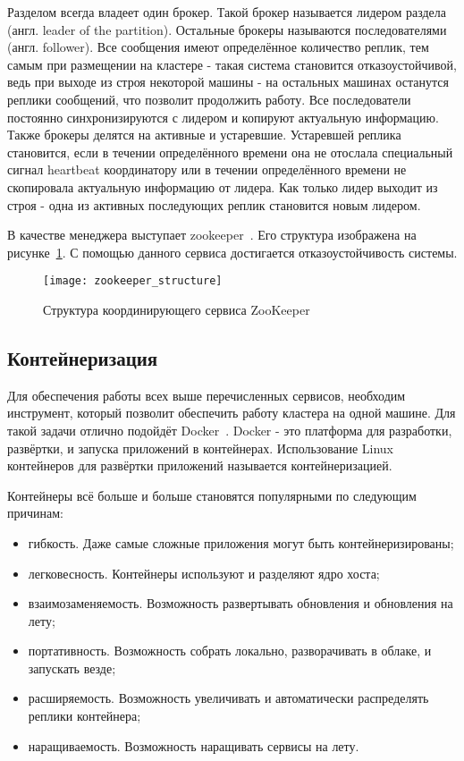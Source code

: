 Разделом всегда владеет один брокер.
Такой брокер называется лидером раздела (англ. leader of the partition).
Остальные брокеры называются последователями (англ. follower).
Все сообщения имеют определённое количество реплик, тем самым при размещении на кластере - такая система становится отказоустойчивой, ведь при выходе из строя некоторой машины - на остальных машинах останутся реплики сообщений, что позволит продолжить работу.
Все последователи постоянно синхронизируются с лидером и копируют актуальную информацию.
Также брокеры делятся на активные и устаревшие.
Устаревшей реплика становится, если в течении определённого времени она не отослала специальный сигнал heartbeat координатору или в течении определённого времени не скопировала актуальную информацию от лидера.
Как только лидер выходит из строя - одна из активных последующих реплик становится новым лидером.

В качестве менеджера выступает zookeeper~\cite{zookeeper_documentation_intro}.
Его структура изображена на рисунке~\ref{pic:lit_review:zookeeper_structure}.                   
С помощью данного сервиса достигается отказоустойчивость системы.

\begin{figure}
    \centering
    \texttt{[image: zookeeper\_structure]}
    \caption{Структура координирующего сервиса ZooKeeper~\cite{zookeeper_documentation_intro}}
    \label{pic:lit_review:zookeeper_structure}
\end{figure}

\subsection{Контейнеризация}

Для обеспечения работы всех выше перечисленных сервисов, необходим инструмент, который позволит обеспечить работу кластера на одной машине.
Для такой задачи отлично подойдёт Docker~\cite{docker_documentation_intro}.
Docker - это платформа для разработки, развёртки, и запуска приложений в контейнерах.
Использование Linux контейнеров для развёртки приложений называется контейнеризацией.

Контейнеры всё больше и больше становятся популярными по следующим причинам:
\begin{itemize}
    \item гибкость. Даже самые сложные приложения могут быть контейнеризированы;
    \item легковесность. Контейнеры используют и разделяют ядро хоста;
    \item взаимозаменяемость. Возможность развертывать обновления и обновления на лету;
    \item портативность. Возможность собрать локально, разворачивать в облаке, и запускать везде;
    \item расширяемость. Возможность увеличивать и автоматически распределять реплики контейнера;
    \item наращиваемость. Возможность наращивать сервисы на лету.
\end{itemize}

